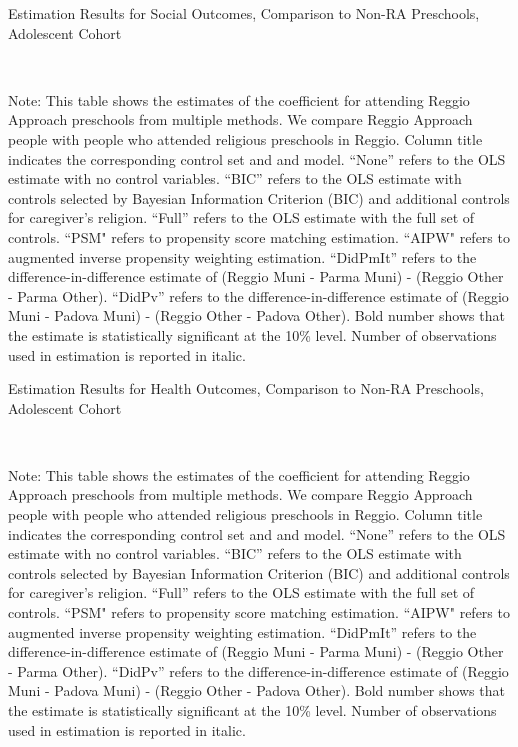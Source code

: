 \begin{table}[H] \caption{Estimation Results for Social Outcomes, Comparison to Non-RA Preschools,  Adolescent Cohort} \label{ols-S-adol-reg-reli}
\scalebox{0.8}{}
\vspace{1ex} \\
\footnotesize\raggedright{Note: This table shows the estimates of the coefficient for attending Reggio Approach preschools from multiple methods. We compare Reggio Approach people with people who attended religious preschools in Reggio. Column title indicates the corresponding control set and and model. ``None'' refers to the OLS estimate with no control variables. ``BIC'' refers to the OLS estimate with controls selected by Bayesian Information Criterion (BIC) and additional controls for caregiver's religion. ``Full'' refers to the OLS estimate with the full set of controls. ``PSM" refers to propensity score matching estimation. ``AIPW" refers to augmented inverse propensity weighting estimation. ``DidPmIt'' refers to the difference-in-difference estimate of (Reggio Muni - Parma Muni) - (Reggio Other - Parma Other). ``DidPv'' refers to the difference-in-difference estimate of (Reggio Muni - Padova Muni) - (Reggio Other - Padova Other). Bold number shows that the estimate is statistically significant at the 10\% level. Number of observations used in estimation is reported in italic.}
\end{table}


\begin{table}[H] \caption{Estimation Results for Health Outcomes, Comparison to Non-RA Preschools,  Adolescent Cohort} \label{ols-H-adol-reg-reli}
\scalebox{0.8}{}
\vspace{1ex} \\
\footnotesize\raggedright{Note: This table shows the estimates of the coefficient for attending Reggio Approach preschools from multiple methods. We compare Reggio Approach people with people who attended religious preschools in Reggio. Column title indicates the corresponding control set and and model. ``None'' refers to the OLS estimate with no control variables. ``BIC'' refers to the OLS estimate with controls selected by Bayesian Information Criterion (BIC) and additional controls for caregiver's religion. ``Full'' refers to the OLS estimate with the full set of controls. ``PSM" refers to propensity score matching estimation. ``AIPW" refers to augmented inverse propensity weighting estimation. ``DidPmIt'' refers to the difference-in-difference estimate of (Reggio Muni - Parma Muni) - (Reggio Other - Parma Other). ``DidPv'' refers to the difference-in-difference estimate of (Reggio Muni - Padova Muni) - (Reggio Other - Padova Other). Bold number shows that the estimate is statistically significant at the 10\% level. Number of observations used in estimation is reported in italic.}
\end{table}


